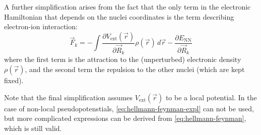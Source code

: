 \documentclass[11pt,bibliography=totoc,index=totoc]{scrbook}   %
\newcommand{\comment}[1]{\hl{#1}}
\begin{document}



A further simplification arises from the fact that the only term in the electronic Hamiltonian that depends on the nuclei coordinates is the term describing
electron-ion interaction:
\begin{equation}
  \vec{F}_k =  - \int \frac{\partial V_{\text{ext}}(\vec{r})}{\partial\vec{R}_k} \rho(\vec{r}) \,d\vec{r} - \frac{\partial E_{\text{NN}}}{\partial\vec{R}_k}
  \label{eq:hellmann-feynman-expl}
\end{equation}
where the first term is the attraction to the (unperturbed) electronic density $\rho(\vec{r})$, and the second term the repulsion to the other nuclei (which are kept fixed).

Note that the final simplification assumes $V_{\text{ext}}(\vec{r})$ to be a local potential.
In the case of non-local pseudopotenstials, \eqref{eq:hellmann-feynman-expl} can not be used, but more complicated expressions can be derived from \eqref{eq:hellmann-feynman}, which is still valid.\cite[57]{Martin:2004}



\end{document}

